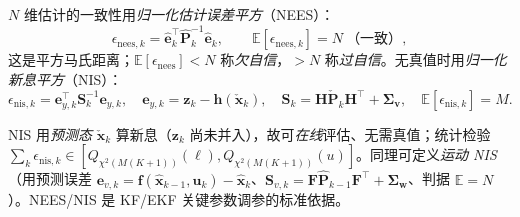 \begin{definition}\label{def:nees-nis}
$N$ 维估计的一致性用\emph{归一化估计误差平方}（NEES）：
\begin{equation}
  \epsilon_{\text{nees},k}=\hat{\mathbf{e}}_k^\top\hat{\mathbf{P}}_k^{-1}\hat{\mathbf{e}}_k,\qquad
  \mathbb{E}[\epsilon_{\text{nees},k}]=N\ \text{（一致）},
  \label{eq:nees}
\end{equation}
这是平方马氏距离；$\mathbb{E}[\epsilon_{\text{nees}}]<N$ 称\emph{欠自信}，$>N$ 称\emph{过自信}。无真值时用\emph{归一化新息平方}（NIS）：
\begin{equation}
  \epsilon_{\text{nis},k}=\mathbf{e}_{y,k}^\top\mathbf{S}_k^{-1}\mathbf{e}_{y,k},\quad
  \mathbf{e}_{y,k}=\mathbf{z}_k-\mathbf{h}(\check{\mathbf{x}}_k),\quad
  \mathbf{S}_k=\mathbf{H}\check{\mathbf{P}}_k\mathbf{H}^\top+\boldsymbol{\Sigma}_{\mathbf{v}},\quad
  \mathbb{E}[\epsilon_{\text{nis},k}]=M.
  \label{eq:nis}
\end{equation}
\end{definition}
NIS 用\emph{预测态} $\check{\mathbf{x}}_k$ 算新息（$\mathbf{z}_k$ 尚未并入），故可\emph{在线}评估、无需真值；统计检验 $\sum_k\epsilon_{\text{nis},k}\in[Q_{\chi^2(M(K+1))}(\ell),Q_{\chi^2(M(K+1))}(u)]$。同理可定义\emph{运动 NIS}（用预测误差 $\mathbf{e}_{v,k}=\mathbf{f}(\hat{\mathbf{x}}_{k-1},\mathbf{u}_k)-\hat{\mathbf{x}}_k$、$\mathbf{S}_{v,k}=\mathbf{F}\hat{\mathbf{P}}_{k-1}\mathbf{F}^\top+\boldsymbol{\Sigma}_{\mathbf{w}}$、判据 $\mathbb{E}=N$）。NEES/NIS 是 KF/EKF 关键参数调参的标准依据\cite{barfoot2024state}。

